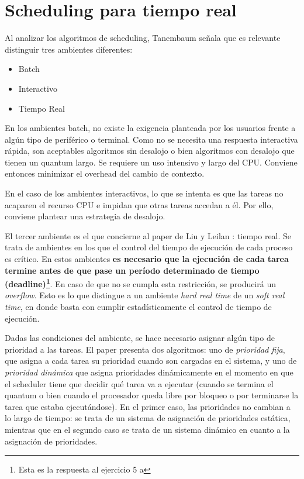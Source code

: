 \section{Scheduling para tiempo real}

Al analizar los algoritmos de scheduling, Tanembaum \cite[p.~136]{tanenbaum2001} señala que es relevante distinguir tres ambientes diferentes:

\begin{itemize}
	\item{Batch}
    
    \item{Interactivo}
    
    \item{Tiempo Real}
\end{itemize}

En los ambientes batch, no existe la exigencia planteada por los usuarios frente a alg\'un tipo de perif\'erico o terminal. Como no se necesita una respuesta interactiva r\'apida, son aceptables algoritmos sin desalojo o bien algoritmos con desalojo que tienen un quantum largo. Se requiere un uso intensivo y largo del CPU. Conviene entonces minimizar el overhead del cambio de contexto.

En el caso de los ambientes interactivos, lo que se intenta es que las tareas no acaparen el recurso CPU e impidan que otras tareas accedan a \'el. Por ello, conviene plantear una estrategia de desalojo.

El tercer ambiente es el que concierne al paper de Liu y Leilan \cite{liuleiland1973}: tiempo real. Se trata de ambientes en los que el control del tiempo de ejecuci\'on de cada proceso es cr\'itico. En estos ambientes \textbf{es necesario que la ejecuci\'on de cada tarea termine antes de que pase un per\'iodo determinado de tiempo (deadline)\footnote{Esta es la respuesta al ejercicio 5 a}}. En caso de que no se cumpla esta restricci\'on, se producir\'a un \textit{overflow}. Esto es lo que distingue a un ambiente \textit{hard real time} de un \textit{soft real time}, en donde basta con cumplir estad\'isticamente el control de tiempo de ejecuci\'on.


Dadas las condiciones del ambiente, se hace necesario asignar alg\'un tipo de prioridad a las tareas. El paper presenta dos algoritmos: uno de \textit{prioridad fija}, que asigna a cada tarea su prioridad cuando son cargadas en el sistema, y uno de \textit{prioridad din\'amica} que asigna prioridades din\'amicamente en el momento en que el scheduler tiene que decidir qu\'e tarea va a ejecutar (cuando se termina el quantum o bien cuando el procesador queda libre por bloqueo o por terminarse la tarea que estaba ejecut\'andose). En el primer caso, las prioridades no cambian a lo largo de tiempo: se trata de un sistema de asignaci\'on de prioridades est\'atica, mientras que en el segundo caso se trata de un sistema din\'amico en cuanto a la asignaci\'on de prioridades. 

